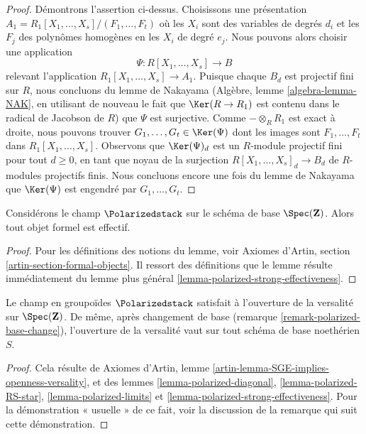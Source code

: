 \begin{proof}
\medskip\noindent
Démontrons l'assertion ci-dessus.
Choisissons une présentation
$A_1 = R_1[X_1, \ldots, X_s]/(F_1, \ldots, F_t)$ où les $X_i$ sont des
variables de degrés $d_i$ et les $F_j$ des polynômes homogènes en les $X_i$ de
degré $e_j$.
Nous pouvons alors choisir une application
$$
\Psi : R[X_1, \ldots, X_s] \longrightarrow B
$$
relevant l'application $R_1[X_1, \ldots, X_s] \to A_1$.
Puisque chaque $B_d$ est projectif fini sur $R$, nous concluons du lemme de
Nakayama (Algèbre, lemme \ref{algebra-lemma-NAK}, en utilisant de nouveau le
fait que $\Ker(R \to R_1)$ est contenu dans le radical de Jacobson de $R$) que
$\Psi$ est surjective. Comme $- \otimes_R R_1$ est exact à droite, nous pouvons
trouver $G_1, \ldots, G_t \in \Ker(\Psi)$ dont les images sont
$F_1, \ldots, F_t$ dans $R_1[X_1, \ldots, X_s]$.
Observons que $\Ker(\Psi)_d$ est un $R$-module projectif fini pour tout
$d \geq 0$, en tant que noyau de la surjection
$R[X_1, \ldots, X_s]_d \to B_d$ de $R$-modules projectifs finis.
Nous concluons encore une fois du lemme de Nakayama que $\Ker(\Psi)$ est
engendré par $G_1, \ldots, G_t$.
\end{proof}

\begin{lemma}
\label{lemma-polarized-existence}
Considérons le champ $\Polarizedstack$ sur le schéma de base
$\Spec(\mathbf{Z})$. Alors tout objet formel est effectif.
\end{lemma}

\begin{proof}
Pour les définitions des notions du lemme, voir
Axiomes d'Artin, section \ref{artin-section-formal-objects}.
Il ressort des définitions que le lemme résulte immédiatement du lemme plus
général \ref{lemma-polarized-strong-effectiveness}.
\end{proof}

\begin{lemma}
\label{lemma-polarized-defo-thy}
Le champ en groupoïdes $\Polarizedstack$ satisfait à l'ouverture de la
versalité sur $\Spec(\mathbf{Z})$.
De même, après changement de base (remarque
\ref{remark-polarized-base-change}), l'ouverture de la versalité vaut sur tout
schéma de base noethérien $S$.
\end{lemma}

\begin{proof}
Cela résulte de
Axiomes d'Artin, lemme \ref{artin-lemma-SGE-implies-openness-versality},
et des lemmes \ref{lemma-polarized-diagonal},
\ref{lemma-polarized-RS-star},
\ref{lemma-polarized-limits} et
\ref{lemma-polarized-strong-effectiveness}.
Pour la démonstration « usuelle » de ce fait, voir la discussion de la remarque
qui suit cette démonstration.
\end{proof}

